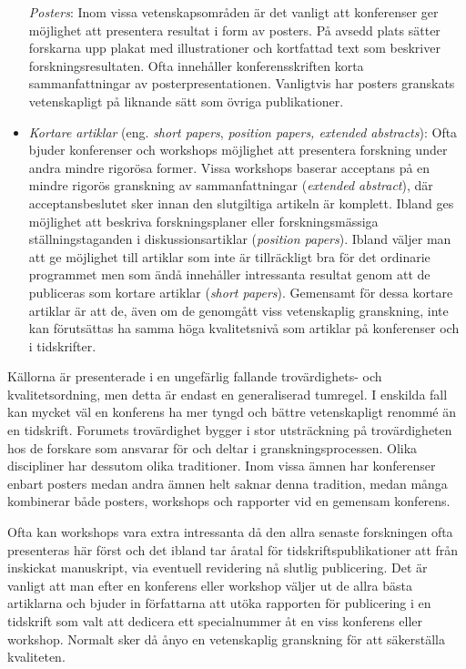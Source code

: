 \begin{itemize}
  \emph{Posters}: Inom vissa vetenskapsområden är det vanligt att
  konferenser ger möjlighet att presentera resultat i form av posters.
  På avsedd plats sätter forskarna upp plakat med illustrationer och
  kortfattad text som beskriver forskningsresultaten. Ofta innehåller
  konferensskriften korta sammanfattningar av posterpresentationen.
  Vanligtvis har posters granskats vetenskapligt på liknande sätt som
  övriga publikationer.
\item
  \emph{Kortare artiklar} (eng. \emph{short papers}, \emph{position
  papers, extended abstracts}): Ofta bjuder konferenser och workshops
  möjlighet att presentera forskning under andra mindre rigorösa former.
  Vissa workshops baserar acceptans på en mindre rigorös granskning av
  sammanfattningar (\emph{extended abstract}), där acceptansbeslutet
  sker innan den slutgiltiga artikeln är komplett. Ibland ges möjlighet
  att beskriva forskningsplaner eller forskningsmässiga
  ställningstaganden i diskussionsartiklar (\emph{position papers}).
  Ibland väljer man att ge möjlighet till artiklar som inte är
  tillräckligt bra för det ordinarie programmet men som ändå innehåller
  intressanta resultat genom att de publiceras som kortare artiklar
  (\emph{short papers}). Gemensamt för dessa kortare artiklar är att de,
  även om de genomgått viss vetenskaplig granskning, inte kan
  förutsättas ha samma höga kvalitetsnivå som artiklar på konferenser
  och i tidskrifter.
\end{itemize}

Källorna är presenterade i en ungefärlig fallande trovärdighets- och
kvalitetsordning, men detta är endast en generaliserad tumregel. I
enskilda fall kan mycket väl en konferens ha mer tyngd och bättre
vetenskapligt renommé än en tidskrift. Forumets trovärdighet bygger i
stor utsträckning på trovärdigheten hos de forskare som ansvarar för och
deltar i granskningsprocessen. Olika discipliner har dessutom olika
traditioner. Inom vissa ämnen har konferenser enbart posters medan andra
ämnen helt saknar denna tradition, medan många kombinerar både posters,
workshops och rapporter vid en gemensam konferens.

Ofta kan workshops vara extra intressanta då den allra senaste
forskningen ofta presenteras här först och det ibland tar åratal för
tidskriftspublikationer att från inskickat manuskript, via eventuell
revidering nå slutlig publicering. Det är vanligt att man efter en
konferens eller workshop väljer ut de allra bästa artiklarna och bjuder
in författarna att utöka rapporten för publicering i en tidskrift som
valt att dedicera ett specialnummer åt en viss konferens eller workshop.
Normalt sker då ånyo en vetenskaplig granskning för att säkerställa
kvaliteten.

